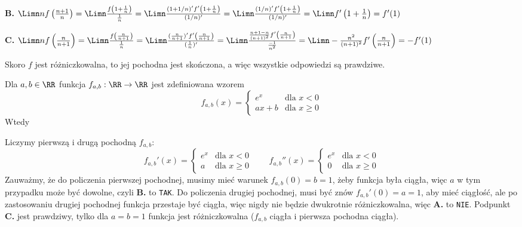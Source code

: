 \begin{solutions}
    \textbf{B.} $\Limn nf\left(\frac{n+1}{n}\right) = \Limn \frac{f\left(1+\frac{1}{n}\right)}{\frac{1}{n}} = \Limn \frac{(1+1/n)'f'\left(1+\frac{1}{n}\right)}{(1/n)'} = \Limn \frac{(1/n)'f'\left(1+\frac{1}{n}\right)}{(1/n)'} = \Limn f'\left(1+\frac{1}{n}\right) = f'(1)$
    
    \textbf{C.} $\Limn nf\left(\frac{n}{n+1}\right) = \Limn \frac{f\left(\frac{n}{n+1}\right)}{\frac{1}{n}} = \Limn \frac{(\frac{n}{n+1})'f'\left(\frac{n}{n+1}\right)}{(\frac{1}{n})'} = \Limn \frac{\frac{n+1-n}{(n+1)^2}f'\left(\frac{n}{n+1}\right)}{\frac{-1}{n^2}} = \Limn -\frac{n^2}{(n+1)^2} f'\left(\frac{n}{n+1}\right) = - f'(1)$

    Skoro $f$ jest różniczkowalna, to jej pochodna jest skończona, a więc wszystkie odpowiedzi są prawdziwe.
    
    \sol Dla $a, b \in \RR$ funkcja $f_{a, b} : \RR \to \RR$ jest zdefiniowana wzorem
    \begin{equation*}
    f_{a, b}(x) =
        \begin{cases}
            e^x & \text{dla $x < 0$}\\
            ax + b & \text{dla $x \geq 0$}
        \end{cases}       
    \end{equation*}
    Wtedy
    
    Liczymy pierwszą i drugą pochodną $f_{a,b}$:
    $$
    f_{a, b}'(x) =
        \begin{cases}
            e^x & \text{dla $x < 0$}\\
            a & \text{dla $x \geq 0$}
        \end{cases}\qquad
    f_{a, b}''(x) =
        \begin{cases}
            e^x & \text{dla $x < 0$}\\
            0 & \text{dla $x \geq 0$}
        \end{cases}
    $$
    Zauważmy, że do policzenia pierwszej pochodnej, musimy mieć warunek $f_{a,b}(0)=b=1$, żeby funkcja była ciągła, więc $a$ w tym przypadku może być dowolne, czyli \textbf{B.} to \texttt{TAK}. Do policzenia drugiej pochodnej, musi być znów $f_{a,b}'(0)=a=1$, aby mieć ciągłość, ale po zastosowaniu drugiej pochodnej funkcja przestaje być ciągła, więc nigdy nie będzie dwukrotnie różniczkowalna, więc \textbf{A.} to \texttt{NIE}. Podpunkt \textbf{C.} jest prawdziwy, tylko dla $a=b=1$ funkcja jest różniczkowalna ($f_{a,b}$ ciągła i pierwsza pochodna ciągła).


\end{solutions}
